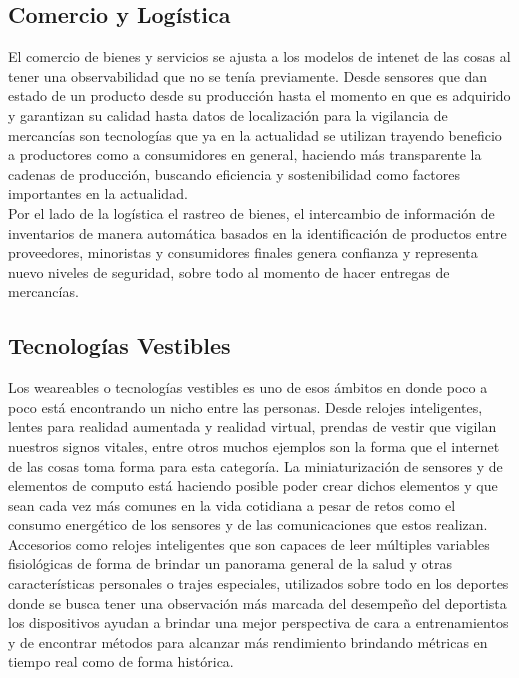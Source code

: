 \subsection{Comercio y Logística}
El comercio de bienes y servicios se ajusta a los modelos de intenet de las cosas al tener una observabilidad que no se tenía previamente. Desde sensores que dan estado de un producto desde su producción hasta el momento en que es adquirido y garantizan su calidad hasta datos de localización para la vigilancia de mercancías son tecnologías que ya en la actualidad se utilizan trayendo beneficio a productores como a consumidores en general, haciendo más transparente la cadenas de producción, buscando eficiencia  y sostenibilidad como factores importantes en la actualidad.\\

Por el lado de la logística el rastreo de bienes, el intercambio de información de inventarios de manera automática basados en la identificación de productos entre proveedores, minoristas y consumidores finales genera confianza y representa nuevo niveles de seguridad, sobre todo al momento de hacer entregas de mercancías.

\subsection{Tecnologías Vestibles}
Los weareables o tecnologías vestibles es uno de esos ámbitos en donde poco a poco está encontrando un nicho entre las personas. Desde relojes inteligentes, lentes para realidad aumentada y realidad virtual, prendas de vestir que vigilan nuestros signos vitales, entre otros muchos ejemplos son la forma que el internet de las cosas toma forma para esta categoría. La miniaturización de sensores y de elementos de computo está haciendo posible poder crear dichos elementos y que sean cada vez más comunes en la vida cotidiana a pesar de retos como el consumo energético de los sensores y de las comunicaciones que estos realizan\cite{ibmappsiot}.\\

Accesorios como relojes inteligentes que son capaces de leer múltiples variables fisiológicas de forma de brindar un panorama general de la salud y otras características personales o trajes especiales, utilizados sobre todo en los deportes donde se busca tener una observación más marcada del desempeño del deportista los dispositivos ayudan a brindar una mejor perspectiva de cara a entrenamientos y de encontrar métodos para alcanzar más rendimiento brindando métricas en tiempo real como de forma histórica.

